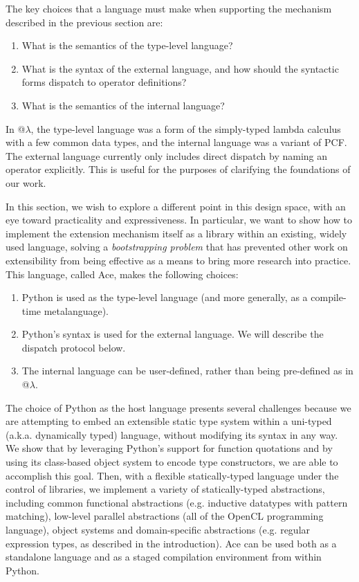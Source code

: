 


The key choices that a language must make when supporting the mechanism described in the previous section are:
\begin{enumerate}
\item What is the semantics of the type-level language?
\item What is the syntax of the external language, and how should the syntactic forms dispatch to  operator definitions?
\item What is the semantics of the internal language?
\end{enumerate}

In @$\lambda$, the type-level language was a form of the simply-typed lambda calculus with a few common data types, and the internal language was a variant of PCF. The external language currently only includes direct dispatch by naming an operator explicitly. This is useful for the purposes of clarifying the foundations of our work.

In this section, we wish to explore a different point in this design space, with an eye toward practicality and expressiveness. In particular, we want to show how to implement {the extension mechanism itself} as a library within an existing, widely used language, solving a \emph{bootstrapping problem} that has prevented  other work on extensibility from being effective as a means to bring more research into practice. This language, called Ace, makes the following choices:

\begin{enumerate}
\item Python is used as the type-level language (and more generally, as a compile-time metalanguage).
\item Python's syntax is used for the external language. We will describe the dispatch protocol below.
\item The internal language can be user-defined, rather than being pre-defined as in @$\lambda$.
\end{enumerate}

The choice of Python as the host language presents several challenges because we are attempting to embed an extensible static type system within a uni-typed (a.k.a. dynamically typed) language, without modifying its syntax in any way. We show that by leveraging Python's support for function quotations and by using its class-based object system to encode type constructors, we are able to accomplish this goal. Then, with a flexible statically-typed language under the control of libraries, we implement a variety of statically-typed abstractions, including common functional abstractions (e.g. inductive datatypes with pattern matching), low-level parallel abstractions (all of the OpenCL programming language), object systems and domain-specific abstractions (e.g. regular expression types, as described in the introduction). Ace can be used both as a standalone language and as a staged compilation environment from within Python.

